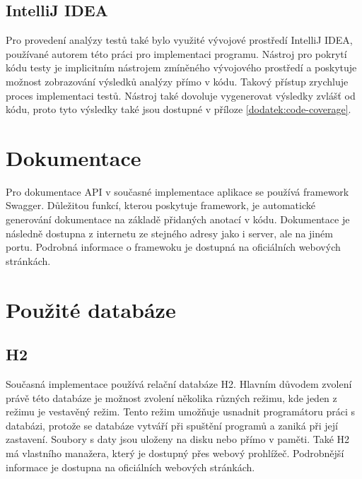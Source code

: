     \subsection{IntelliJ IDEA}\label{resere:testovani:intellij-idea}
        Pro provedení analýzy testů také bylo využité vývojové prostředí IntelliJ IDEA, používané autorem této práci pro implementaci programu. Nástroj pro pokrytí kódu testy je implicitním nástrojem zmíněného vývojového prostředí a poskytuje možnost zobrazování výsledků analýzy přímo v kódu. Takový přístup zrychluje proces implementaci testů. Nástroj také dovoluje vygenerovat výsledky zvlášť od kódu, proto tyto výsledky také jsou dostupné v příloze \ref{dodatek:code-coverage}.


\section{Dokumentace}\label{resere:dokumentace}
    Pro dokumentace API v současné implementace aplikace se používá framework Swagger. Důležitou funkcí, kterou poskytuje framework, je automatické generování dokumentace na základě přidaných anotací v kódu. Dokumentace je následně dostupna z internetu ze stejného adresy jako i server, ale na jiném portu. Podrobná informace o framewoku je dostupná na oficiálních webových stránkách\cite{swagger-doc}.
    
\section{Použité databáze}\label{resere:databaze}

    \subsection{H2}
        Současná implementace používá relační databáze H2. Hlavním důvodem zvolení právě této databáze je možnost zvolení několika různých režimu, kde jeden z režimu je vestavěný režim. Tento režim umožňuje usnadnit programátoru práci s databázi, protože se databáze vytváří při spuštění programů a zaniká při její zastavení. Soubory s daty jsou uloženy na disku nebo přímo v paměti. Také H2 má vlastního manažera, který je dostupný přes webový prohlížeč. Podrobnější informace je dostupna na oficiálních webových stránkách\cite{h2-doc}.
        
